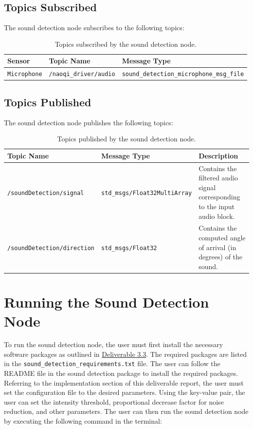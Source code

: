 \documentclass{CSSRforAfrica}
\begin{document}
\subsection*{Topics Subscribed}
The sound detection node subscribes to the following topics:
\begin{table}[!h]
	\centering
	\begin{tabularx}{\linewidth}{| l | l | X |}
		\hline
		\rowcolor{blue!20} %
		\textbf{Sensor} & \textbf{Topic Name} & \textbf{Message Type} \\
		\hline
		{\footnotesize \texttt{Microphone} }  & {\footnotesize \texttt{/naoqi\_driver/audio}} & {\footnotesize \texttt{sound\_detection\_microphone\_msg\_file}} \\
		\hline
	\end{tabularx}
	\caption{Topics subscribed by the sound detection node.}
\end{table}

\subsection*{Topics Published}

The sound detection node publishes the following topics:
\begin{table}[!h]
	\centering
	\begin{tabularx}{\linewidth}{| l | l | >{\raggedright\arraybackslash}X |}
		\hline
		\rowcolor{blue!20}
		\textbf{Topic Name} & \textbf{Message Type} & \textbf{Description} \\
		\hline
		{\footnotesize \texttt{/soundDetection/signal}}  & {\footnotesize \texttt{std\_msgs/Float32MultiArray}} & {\footnotesize Contains the filtered audio signal corresponding to the input audio block.} \\
		\hline
		{\footnotesize \texttt{/soundDetection/direction}}  & {\footnotesize \texttt{std\_msgs/Float32}} & {\footnotesize Contains the computed angle of arrival (in degrees) of the sound.} \\
		\hline
	\end{tabularx}
	\caption{Topics published by the sound detection node.}
\end{table}

\newpage

\section{Running the Sound Detection Node}
To run the sound detection node, the user must first install the necessary software packages as outlined in 
\href{https://cssr4africa.github.io/deliverables/CSSR4Africa_Deliverable_D3.3.pdf}{Deliverable 3.3}. The required packages
are listed in the {\small\texttt{sound\_detection\_requirements.txt}} file. The user can follow the README file in the sound detection
package to install the required packages. Referring to the implementation section of this deliverable report, the user must 
set the configuration file to the desired parameters. Using the key-value pair, the user can set the intensity threshold, proportional decrease factor for noise reduction, and other parameters. The user can then run the sound detection node by executing the following 
command in the terminal:
\end{document}
